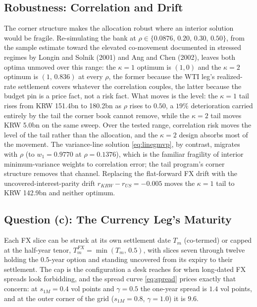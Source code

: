 \documentclass[11pt,a4paper]{article}
\begin{document}
\subsection{Robustness: Correlation and Drift}
\label{sec:robust}

The corner structure makes the allocation robust where an interior solution would be fragile. Re-simulating the bank at $\rho\in\{0.0876,\,0.20,\,0.30,\,0.50\}$, from the sample estimate toward the elevated co-movement documented in stressed regimes by Longin and Solnik (2001) and Ang and Chen (2002), leaves both optima unmoved over this range: the $\kappa=1$ optimum is $(1,0)$ and the $\kappa=2$ optimum is $(1,\,0.836)$ at every $\rho$, the former because the WTI leg's realized-rate settlement covers whatever the correlation couples, the latter because the budget pin is a price fact, not a risk fact. What moves is the level: the $\kappa=1$ tail rises from KRW 151.4bn to 180.2bn as $\rho$ rises to $0.50$, a $19\%$ deterioration carried entirely by the tail the corner book cannot remove, while the $\kappa=2$ tail moves KRW 5.0bn on the same sweep. Over the tested range, correlation risk moves the level of the tail rather than the allocation, and the $\kappa=2$ design absorbs most of the movement. The variance-line solution \eqref{eq:linegmvp}, by contrast, migrates with $\rho$ (to $w_1=0.9770$ at $\rho=0.1376$), which is the familiar fragility of interior minimum-variance weights to correlation error; the tail program's corner structure removes that channel. Replacing the flat-forward FX drift with the uncovered-interest-parity drift $r_{KRW}-r_{US}=-0.005$ moves the $\kappa=1$ tail to KRW 142.9bn and neither optimum.

\subsection{Question (c): The Currency Leg's Maturity}
\label{sec:fxmat}

Each FX slice can be struck at its own settlement date $T_m$ (co-termed) or capped at the half-year tenor, $T^{FX}_m=\min(T_m,\,0.5)$, with slices seven through twelve holding the $0.5$-year option and standing uncovered from its expiry to their settlement. The cap is the configuration a desk reaches for when long-dated FX spreads look forbidding, and the spread curve \eqref{eq:spread} prices exactly that concern: at $s_{1M}=0.4$ vol points and $\gamma=0.5$ the one-year spread is $1.4$ vol points, and at the outer corner of the grid ($s_{1M}=0.8$, $\gamma=1.0$) it is $9.6$.
\end{document}
